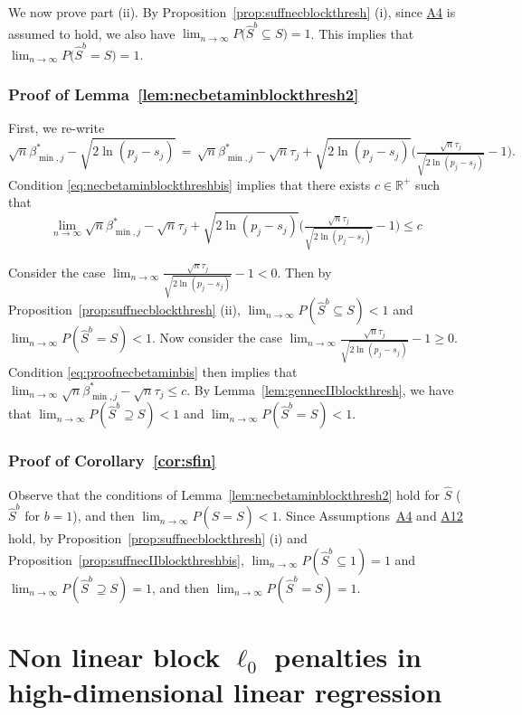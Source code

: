\documentclass[bj,authoryear]{imsart}
\theoremstyle{plain}
\newcommand{\R}{\mathbb{R}}
\begin{document}
We now prove part (ii). By Proposition~\ref{prop:suffnecblockthresh} (i), since \hyperlink{lab:A4}{A4} is assumed to hold, we also have $\lim_{n\to\infty}P\big(\hat{S}^{b} \subseteq S\big)=1$. This implies that $\lim_{n\to\infty}P\big(\hat{S}^{b} = S\big)= 1$.

\subsubsection{Proof of Lemma~\ref{lem:necbetaminblockthresh2}}
 First, we re-write 
 $$\sqrt{n}\beta_{\min,j}^*-\sqrt{2\ln(p_j-s_j)} \,=\, \sqrt{n}\beta_{\min,j}^*-\sqrt{n}\tau_j+\sqrt{2\ln(p_j-s_j)}\Big(\tfrac{\sqrt{n}\tau_j}{\sqrt{2\ln(p_j-s_j)}}-1\Big).$$ 
 Condition \eqref{eq:necbetaminblockthreshbis} implies that there exists $c\in\R^+$ such that
  \begin{equation}\label{eq:proofnecbetaminbis}
      \lim_{n\to \infty}\sqrt{n}\beta_{\min,j}^*-\sqrt{n}\tau_j+\sqrt{2\ln(p_j-s_j)}\Big(\tfrac{\sqrt{n}\tau_j}{\sqrt{2\ln(p_j-s_j)}}-1\Big)\leq c
  \end{equation}

Consider the case $\lim_{n\to \infty}\tfrac{\sqrt{n}\tau_j}{\sqrt{2\ln(p_j-s_j)}}-1<0$. Then by Proposition~\ref{prop:suffnecblockthresh} (ii),
$\lim_{n\to \infty}P(\hat{S}^{b} \subseteq S)< 1$ and $\lim_{n\to \infty}P(\hat{S}^{b} = S)< 1$.  Now consider the case $\lim_{n\to \infty}\tfrac{\sqrt{n}\tau_j}{\sqrt{2\ln(p_j-s_j)}}-1 \geq0$. Condition \eqref{eq:proofnecbetaminbis} then implies that $\lim_{n\to \infty}\sqrt{n}\beta_{\min,j}^*-\sqrt{n}\tau_j \leq c$. By Lemma~\ref{lem:gennecIIblockthresh}, we have that $\lim_{n\to \infty}P(\hat{S}^{b} \supseteq S)< 1$ and $\lim_{n\to \infty}P(\hat{S}^{b} = S)< 1$.

\subsubsection{Proof of Corollary~\ref{cor:sfin}} Observe that the conditions of Lemma~\ref{lem:necbetaminblockthresh2} hold for $\hat{S}$ ($\hat{S}^b$ for $b=1$), and then $\lim_{n\to \infty}P(\hat{S} = S)<1$. Since Assumptions~\hyperlink{lab:A4}{A4} and \hyperlink{lab:A12}{A12} hold, by Proposition~\ref{prop:suffnecblockthresh} (i) and Proposition~\ref{prop:suffnecIIblockthreshbis}, $\lim_{n\to \infty}P(\hat{S}^b \subseteq 1)= 1$ and $\lim_{n\to \infty}P( \hat{S}^b \supseteq S)=1$, and then $\lim_{n\to \infty}P(\hat{S}^b = S)=1$.

\section{Non linear block $\ell_0$ penalties in high-dimensional linear regression}\label{suppsec:appendixnonlinear}
\end{document}
